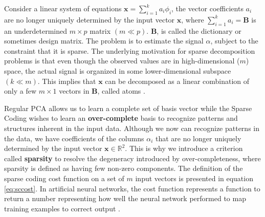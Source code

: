 Consider a linear system of equations $\mathbf{x} = \sum_{i=1}^ka_i \phi_i$, the vector coefficients $a_i$ are no longer uniquely determined by the input vector $\mathbf{x}$, where $\sum_{i=1}^ka_i = \mathbf{B}$ is an
underdetermined $m\times p$ matrix $(m \ll p)$. $\mathbf{B}$, is called the dictionary or sometimes design matrix. The problem is to estimate the signal $\alpha$, subject to the
constraint that it is sparse. The underlying motivation for sparse
decomposition problems is that even though the observed values are in
high-dimensional ($m$) space, the actual signal is organized in some
lower-dimensional subspace $(k \ll m)$. This implies that $\mathbf{x}$ can be decomposed as a linear combination of only a few $m \times 1$ vectors in $\mathbf{B}$, called atoms \cite{sc}.

Regular PCA allows us to learn a complete set of basis vector while the Sparse Coding wishes to learn an \textbf{over-complete}
basis to recognize patterns and structures inherent in the input data.
Although we now can recognize patterns in the data, we have coefficients of the columns
$\alpha_i$ that are no longer uniquely determined by the input vector
$\mathbf{x} \in \mathbb{R}^2$. This is why we introduce a criterion called
\textbf{sparsity} to resolve the degeneracy introduced by
over-completeness, where sparsity is defined as having few non-zero
components. The definition of the sparse coding cost function on a set of $m$
input vectors is presented in equation \ref{eq:sccost}. In artificial
neural networks, the cost function represents a function to return a number representing how well the neural network performed to map training examples to correct output \cite{olshausen}.

